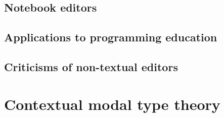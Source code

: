 \subsection{Notebook editors}
\label{sec:notebook_editors}



\subsection{Applications to programming education}
\label{sec:programming-education}

\subsection{Criticisms of non-textual editors}
\label{sec:textual-benefits}

\section{Contextual modal type theory}
\label{sec:cmtt}


